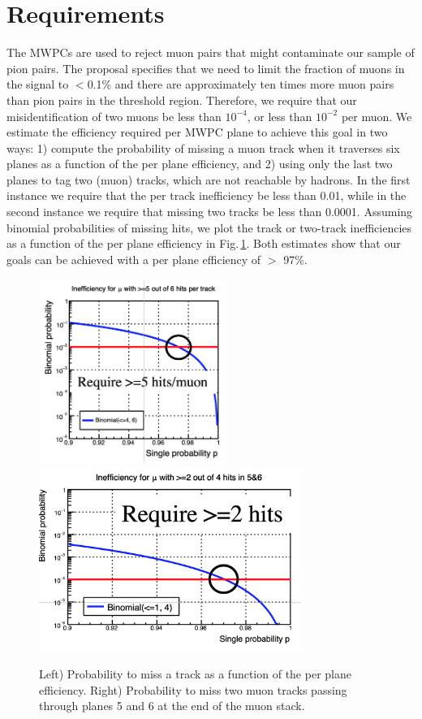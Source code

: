 \documentclass[12pt]{article}
\begin{document}
\section{Requirements}
The MWPCs are used to reject muon pairs that might contaminate our sample of pion pairs. The proposal specifies that we need to limit the fraction of muons in the signal to $<$0.1\% and there are approximately ten times more muon pairs than pion pairs in the threshold region. Therefore, we require that our misidentification of two muons be less than $10^{-4}$, or less than $10^{-2}$ per muon. We estimate the efficiency required per MWPC plane to achieve this goal in two ways: 1) compute the probability of missing a muon track when it traverses six planes as a function of the per plane efficiency, and 2) using only the last two planes to tag two (muon) tracks, which are not reachable by hadrons. In the first instance we require that the per track inefficiency be less than 0.01, while in the second instance we require that missing two tracks be less than 0.0001. Assuming binomial probabilities of missing hits, we plot the track or two-track inefficiencies as a function of the per plane efficiency in Fig.\,\ref{fig:Ineff_muons}. Both estimates show that our goals can be achieved with a per plane efficiency of $>$ 97\%.

\begin{figure}[tbph]
\begin{center}
\includegraphics[height=6cm,clip=true]{Ineff_track}
\includegraphics[height=6cm,clip=true]{Ineff_5-6}
\caption{Left) Probability to miss a track as a function of the per plane efficiency. Right) Probability to miss two muon tracks passing through planes 5 and 6 at the end of the muon stack. 
\label{fig:Ineff_muons}}
\end{center}
\end{figure} 
\end{document}
